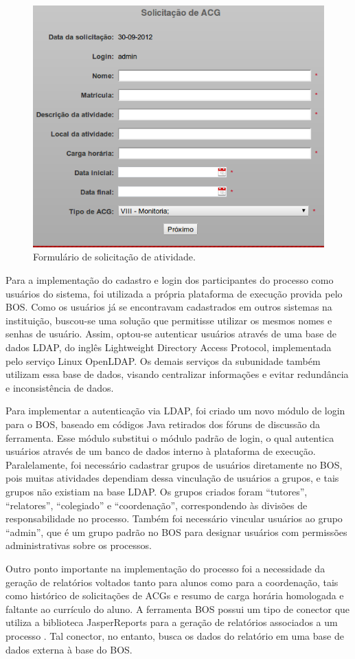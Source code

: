 \documentclass[12pt]{article}
\begin{document}
\begin{figure}[ht]
\centering
\includegraphics[width=.6\textwidth]{images/formSolicitacao.png}
\caption{Formulário de solicitação de atividade.}
\label{fig:Fig2}
\end{figure}

Para a implementação do cadastro e login dos participantes do processo como usuários do sistema, foi utilizada a própria plataforma de execução provida pelo BOS. Como os usuários já se encontravam cadastrados em outros sistemas na instituição, buscou-se uma solução que permitisse utilizar os mesmos nomes e senhas de usuário. Assim, optou-se autenticar usuários através de uma base de dados LDAP, do inglês Lightweight Directory Access Protocol, implementada pelo serviço Linux OpenLDAP. Os demais serviços da subunidade também utilizam essa base de dados, visando centralizar informações e evitar redundância e inconsistência de dados.

Para implementar a autenticação via LDAP, foi criado um novo módulo de login para o BOS, baseado em códigos Java retirados dos fóruns de discussão da ferramenta. Esse módulo substitui o módulo padrão de login, o qual autentica usuários através de um banco de dados interno à plataforma de execução. Paralelamente, foi necessário cadastrar grupos de usuários diretamente no BOS, pois muitas atividades dependiam dessa vinculação de usuários a grupos, e tais grupos não existiam na base LDAP. Os grupos criados foram “tutores”, “relatores”, “colegiado” e “coordenação”, correspondendo às divisões de responsabilidade no processo. Também foi necessário vincular usuários ao grupo “admin”, que é um grupo padrão no BOS para designar usuários com permissões administrativas sobre os processos.

Outro ponto importante na implementação do processo foi a necessidade da geração de relatórios voltados tanto para alunos como para a coordenação, tais como histórico de solicitações de ACGs e resumo de carga horária homologada e faltante ao currículo do aluno. A ferramenta BOS possui um tipo de conector que utiliza a biblioteca JasperReports para a geração de relatórios associados a um processo \cite{JASPERSOFT}. Tal conector, no entanto, busca os dados do relatório em uma base de dados externa à base do BOS.
\end{document}
